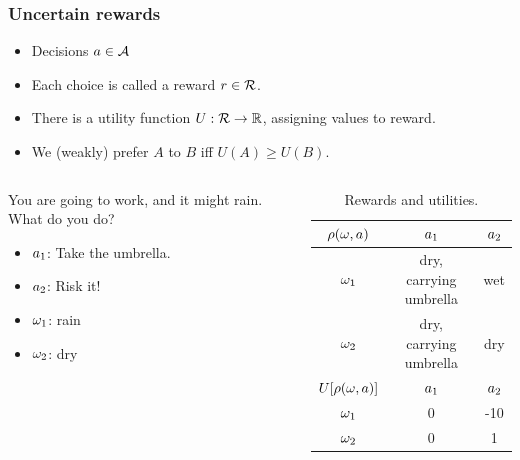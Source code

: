 \begin{frame}
  \frametitle{Uncertain rewards}
  \begin{itemize}
  \item Decisions $a \in \mathcal{A}$
  \item Each choice is called a \alert{reward} $r \in {\mathcal{R}}$.
  \item There is a \alert{utility function} $U : {\mathcal{R}} \to {\mathbb{R}}$, assigning values to reward.
  \item We (weakly) prefer $A$ to $B$ iff $U(A) \geq U(B)$.
  \end{itemize}

  \begin{example}
    \begin{columns}
      \begin{column}{0.5\textwidth}
      You are going to work, and it might rain.  What do you do?
        \begin{itemize}
        \item $a_1$: Take the umbrella.
        \item $a_2$: Risk it!
        \item $\omega_1$: rain
        \item $\omega_2$: dry
        \end{itemize}
      \end{column}
      \begin{column}{0.5\textwidth}
      \begin{table}
          \centering
          \begin{tabular}{c|c|c}
            $\rho(\omega,a)$ & $a_1$ & $a_2$ \\ %
            \hline
            $\omega_1$ & dry, carrying umbrella & wet\\
            $\omega_2$ & dry, carrying umbrella & dry\\
            \hline
            \hline
            $U[\rho(\omega,a)]$ & $a_1$ & $a_2$ \\
            \hline
            $\omega_1$ & 0 & -10\\
            $\omega_2$ & 0 & 1
          \end{tabular}
          \caption{Rewards and utilities.}
          \label{tab:rain-utility-function}
        \end{table}


\end{column}
\end{columns}
\end{example}
\end{frame}
